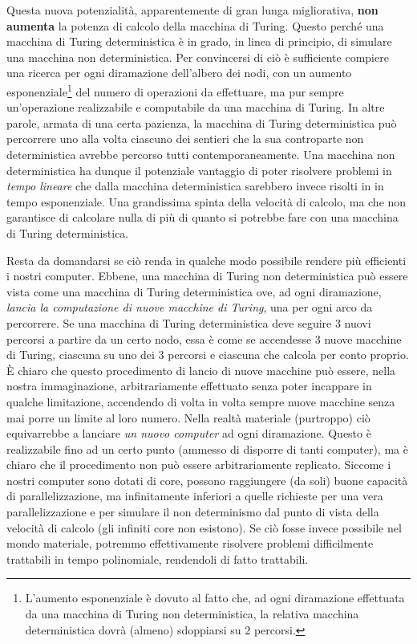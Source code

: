 \documentclass[10pt]{\classname}
\theoremstyle{newlinethm}
\theoremstyle{theorem}
\theoremstyle{definition}
\theoremstyle{definition}
\theoremstyle{definition}
\theoremstyle{definition}
\begin{document}
Questa nuova potenzialità, apparentemente di
gran lunga migliorativa, \textbf{non aumenta} la potenza di calcolo della
macchina di Turing. Questo perché una macchina di Turing deterministica è in grado, in linea di principio, di
simulare una macchina non deterministica. Per convincersi di ciò è sufficiente
compiere una ricerca per ogni diramazione dell'albero dei nodi, con un aumento
esponenziale\footnote{L'aumento esponenziale è dovuto al fatto che, ad ogni
diramazione effettuata da una macchina di Turing non deterministica, la
relativa macchina deterministica dovrà (almeno) sdoppiarsi su $2$ percorsi.}
del numero di operazioni da effettuare, ma pur sempre un'operazione
realizzabile e computabile da una macchina di Turing. In altre parole, armata
di una certa pazienza, la macchina di Turing deterministica può percorrere uno
alla volta ciascuno dei sentieri che la sua controparte non deterministica
avrebbe percorso tutti contemporaneamente. Una macchina non deterministica ha
dunque il potenziale vantaggio di poter risolvere problemi in \emph{tempo
lineare} che dalla macchina deterministica sarebbero invece risolti in in tempo
esponenziale. Una grandissima spinta della velocità di calcolo, ma che non
garantisce di calcolare nulla di più di quanto si potrebbe fare con una
macchina di Turing deterministica. 

Resta da domandarsi se ciò renda in qualche
modo possibile rendere più efficienti i nostri computer. Ebbene, una macchina
di Turing non deterministica può essere vista come una macchina di Turing
deterministica ove, ad ogni diramazione, \emph{lancia la computazione di nuove
macchine di Turing}, una per ogni arco da percorrere. Se una macchina di Turing deterministica deve seguire 3
nuovi percorsi a partire da un certo nodo, essa è come se accendesse 3 nuove
macchine di Turing, ciascuna su uno dei 3 percorsi e ciascuna che calcola per conto
proprio. È chiaro che questo procedimento di lancio di nuove macchine può
essere, nella nostra immaginazione, arbitrariamente effettuato senza poter
incappare in qualche limitazione, accendendo di volta in volta sempre nuove macchine senza mai porre un limite al loro numero. Nella realtà materiale (purtroppo) ciò
equivarrebbe a lanciare \emph{un nuovo computer} ad ogni diramazione. Questo è
realizzabile fino ad un certo punto (ammesso di disporre di tanti computer), ma
è chiaro che il procedimento non può essere arbitrariamente replicato. Siccome
i nostri computer sono dotati di core, possono raggiungere (da soli) buone
capacità di parallelizzazione, ma infinitamente inferiori a quelle richieste
per una vera parallelizzazione e per simulare il non determinismo dal punto di
vista della velocità di calcolo (gli infiniti core non esistono). Se ciò fosse
invece possibile nel mondo materiale, potremmo effettivamente risolvere
problemi difficilmente trattabili in tempo polinomiale, rendendoli di fatto
trattabili.
\end{document}
